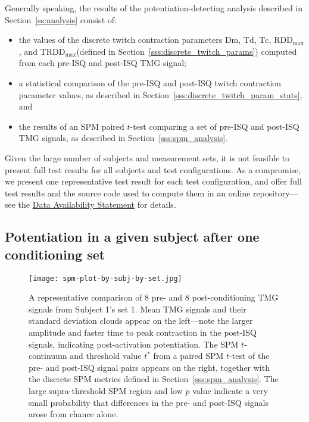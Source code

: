 \documentclass[utf8]{FrontiersinHarvard}
\newcommand{\Dm}{\ensuremath{\text{Dm}}\xspace}
\newcommand{\Td}{\ensuremath{\text{Td}}\xspace}
\newcommand{\Tc}{\ensuremath{\text{Tc}}\xspace}
\newcommand{\RDDMax}{\ensuremath{ \text{RDD}_{\text{max}}}\xspace}
\newcommand{\RDDMaxTime}{\ensuremath{ \text{TRDD}_{\text{max}}}\xspace}
\begin{document}
Generally speaking, the results of the potentiation-detecting analysis described in Section~\ref{ss:analysis} consist of:
\begin{itemize}

    \item the values of the discrete twitch contraction parameters \Dm, \Td, \Tc, \RDDMax, and \RDDMaxTime (defined in Section~\ref{sss:discrete_twitch_params}) computed from each pre-ISQ and post-ISQ TMG signal;

    \item a statistical comparison of the pre-ISQ and post-ISQ twitch contraction parameter values, as described in Section~\ref{sss:discrete_twitch_param_stats}, and

    \item the results of an SPM paired $ t $-test comparing a set of pre-ISQ and post-ISQ TMG signals, as described in Section~\ref{sss:spm_analysis}.

\end{itemize}
Given the large number of subjects and measurement sets, it is not feasible to present full test results for all subjects and test configurations.
As a compromise, we present one representative test result for each test configuration, and offer full test results and the source code used to compute them in an online repository---see the \hyperref[s:data_availability]{Data Availability Statement} for details.


\subsection{Potentiation in a given subject after one conditioning set}

\begin{figure}
	\centering
    \texttt{[image: spm-plot-by-subj-by-set.jpg]}
    \caption{A representative comparison of 8 pre- and 8 post-conditioning TMG signals from Subject 1's set 1.
    Mean TMG signals and their standard deviation clouds appear on the left---note the larger amplitude and faster time to peak contraction in the post-ISQ signals, indicating post-activation potentiation.
    The SPM $ t $-continuum and threshold value $ t^{*} $ from a paired SPM $ t $-test of the pre- and post-ISQ signal pairs appears on the right, together with the discrete SPM metrics defined in Section~\ref{sss:spm_analysis}.
    The large supra-threshold SPM region and low $ p $ value indicate a very small probability that differences in the pre- and post-ISQ signals arose from chance alone.}
    \label{fig:spm_example_result_by_subj_by_set}
\end{figure}
\end{document}
